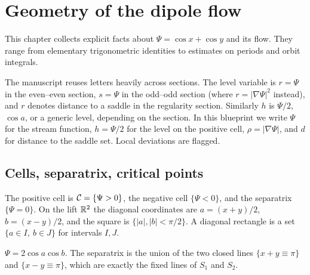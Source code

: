 \chapter{Geometry of the dipole flow}
\label{chap:geometry}

This chapter collects explicit facts about $\Psi=\cos x+\cos y$ and its flow.
They range from elementary trigonometric identities to estimates on periods
and orbit integrals.

\begin{remark}
The manuscript reuses letters heavily across sections. The level variable is
$r=\Psi$ in the even--even section, $s=\Psi$ in the odd--odd section (where
$r=|\nabla\Psi|^2$ instead), and $r$ denotes distance to a saddle in the
regularity section. Similarly $h$ is $\Psi/2$, $\cos a$, or a generic level,
depending on the section. In this blueprint we write $\Psi$ for the stream
function, $h=\Psi/2$ for the level on the positive cell, $\rho=|\nabla\Psi|$,
and $d$ for distance to the saddle set. Local deviations are flagged.
\end{remark}

\section{Cells, separatrix, critical points}

\begin{definition}
\label{def:cells}
\leanok
The positive cell is $\mathcal{C}=\{\Psi>0\}$, the negative cell $\{\Psi<0\}$, and the
separatrix $\{\Psi=0\}$. On the lift $\mathbb{R}^2$ the diagonal coordinates are
$a=(x+y)/2$, $b=(x-y)/2$, and the square is $\{|a|,|b|<\pi/2\}$. A diagonal rectangle is a
set $\{a\in I,\ b\in J\}$ for intervals $I,J$.
\end{definition}

\begin{lemma}
\label{lem:separatrix-lines}
\leanok
$\Psi=2\cos a\cos b$. The separatrix is the union of the two closed lines
$\{x+y\equiv\pi\}$ and $\{x-y\equiv\pi\}$, which are exactly the fixed lines of
$S_1$ and $S_2$.
\end{lemma}

